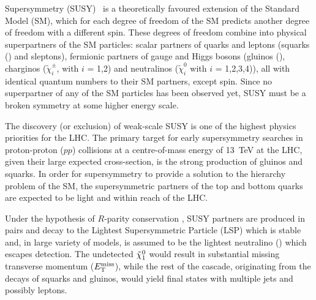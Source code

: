 
Supersymmetry (SUSY)~%
is a theoretically favoured extension of the Standard Model (SM),
which for each degree of freedom of the SM predicts another degree of
freedom with a different spin. These degrees of freedom combine into
physical superpartners of the SM particles: scalar partners of quarks
and leptons (squarks (\sq) and sleptons), fermionic
partners of gauge and Higgs bosons (gluinos (\gl), charginos
($\tilde{\chi}^{\pm}_{i}$, with $i$ = 1,2) and neutralinos
($\tilde{\chi}^{0}_{i}$ with $i$ = 1,2,3,4)), all with identical quantum numbers to their SM partners, except spin.
Since no superpartner of any of the SM particles has been observed yet,
SUSY must be a broken symmetry at some higher energy scale.

The discovery (or exclusion) of weak-scale SUSY is one of the highest
physics priorities for the LHC. The primary target for early
supersymmetry searches in proton-proton ($pp$) collisions at
a centre-of-mass energy of 13~TeV at the LHC, given their large
expected cross-section, is the strong production of gluinos and squarks.
In order for supersymmetry to provide a solution to the hierarchy problem of the SM, the supersymmetric partners of the top and bottom quarks are 
expected to be light and within reach of the LHC. 

Under the hypothesis of $R$-parity conservation
, SUSY
partners are produced in pairs and decay to the Lightest
Supersymmetric Particle (LSP) which is stable and, in large variety of
models, is assumed to be the lightest neutralino (\neut) which escapes detection.
The undetected $\tilde{\chi}_{1}^{0}$ would result in substantial missing
transverse momentum ($E_{\mathrm{T}}^{\mathrm{miss}}$), while the rest of the cascade, originating from the decays of
squarks and gluinos, would yield final states with multiple jets and
possibly leptons.

